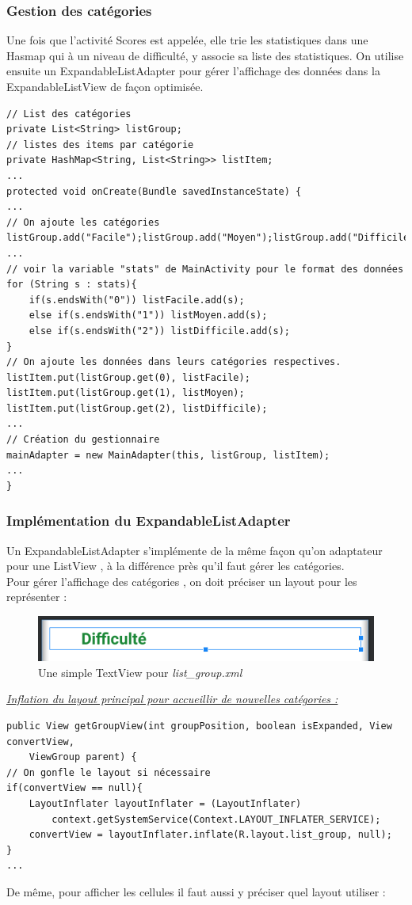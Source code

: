\documentclass{article}
\begin{document}
\subsubsection{Gestion des catégories}
Une fois que l'activité Scores est appelée, elle trie les statistiques dans une Hasmap qui à un niveau de difficulté, y associe sa liste des statistiques. On utilise ensuite un ExpandableListAdapter pour gérer l'affichage des données dans la ExpandableListView de façon optimisée.

\begin{verbatim}
// List des catégories
private List<String> listGroup;
// listes des items par catégorie
private HashMap<String, List<String>> listItem;
...
protected void onCreate(Bundle savedInstanceState) {
...
// On ajoute les catégories
listGroup.add("Facile");listGroup.add("Moyen");listGroup.add("Difficile");
...
// voir la variable "stats" de MainActivity pour le format des données
for (String s : stats){
    if(s.endsWith("0")) listFacile.add(s);
    else if(s.endsWith("1")) listMoyen.add(s);
    else if(s.endsWith("2")) listDifficile.add(s);
}
// On ajoute les données dans leurs catégories respectives.
listItem.put(listGroup.get(0), listFacile);
listItem.put(listGroup.get(1), listMoyen);
listItem.put(listGroup.get(2), listDifficile);
...
// Création du gestionnaire
mainAdapter = new MainAdapter(this, listGroup, listItem);
...
}
\end{verbatim}

\subsubsection{Implémentation du ExpandableListAdapter}
Un ExpandableListAdapter s'implémente de la même façon qu'on adaptateur pour une ListView \cite{androidProf}, à la différence près qu'il faut gérer les catégories.\\
Pour gérer l'affichage des catégories \cite{listView}, on doit préciser un layout pour les représenter :

\begin{figure}[H]
    \centering
    \includegraphics[width=0.7\linewidth]{androidGroupLayout.png}
    \caption{Une simple TextView pour \textit{list\_group.xml}}
\end{figure}

\noindent\underline{\textit{Inflation du layout principal pour accueillir de nouvelles catégories :}}
\begin{verbatim}
public View getGroupView(int groupPosition, boolean isExpanded, View convertView, 
    ViewGroup parent) {
// On gonfle le layout si nécessaire
if(convertView == null){
    LayoutInflater layoutInflater = (LayoutInflater) 
        context.getSystemService(Context.LAYOUT_INFLATER_SERVICE);
    convertView = layoutInflater.inflate(R.layout.list_group, null);
}
...
\end{verbatim}
De même, pour afficher les cellules il faut aussi y préciser quel layout utiliser :
\end{document}
